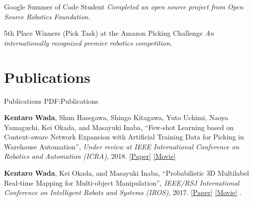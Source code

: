 \documentclass[letterpaper,MMMyyyy,nonstop]{simpleresumecv}
\begin{document}
\begin{body}
Google Summer of Code Student
\hfill
{\it {}}
\newline
{\it Completed an open source project from Open Source Robotics Foundation.}

\BigGapNoBreak

5th Place Winners (Pick Task) at the Amazon Picking Challenge
\hfill
{\it {}}
\newline
{\it An internationally recognized premier robotics competition.}


\section
{Publications}
{Publications}
{PDF:Publications}



\textbf{Kentaro Wada}, Shun Hasegawa, Shingo Kitagawa, Yuto Uchimi, Naoya Yamaguchi, Kei Okada, and Masayuki Inaba,
``Few-shot Learning based on Context-aware Network Expansion with Artificial Training Data for Picking in Warehouse Automation'',
\textit{Under review at IEEE International Conference on Robotics and Automation (ICRA)}, 2018.
\href{https://drive.google.com/open?id=1wLL3vXzOuxBeimeHqjvpc74gMmeipoCJ}{\underline{[Paper]}}
\href{https://drive.google.com/open?id=1-hWOkueOqEYKIV0WDsxO3JOroIE56F8u}{\underline{[Movie]}}

\BigGapNoBreak

\textbf{Kentaro Wada}, Kei Okada, and Masayuki Inaba,
``Probabilistic 3D Multilabel Real-time Mapping for Multi-object Manipulation'',
\textit{IEEE/RSJ International Conference on Intelligent Robots and Systems (IROS)}, 2017.
\href{https://drive.google.com/open?id=1frqieyHiQBqpr1e9mWPrzfaX8FbpLcuX}{\underline{[Paper]}}
\href{https://drive.google.com/open?id=1nUFB1_jHLomxAEhlWsgaMRkdGycB5Dhk}{\underline{[Movie]}}
.


\end{body}
\end{document}
